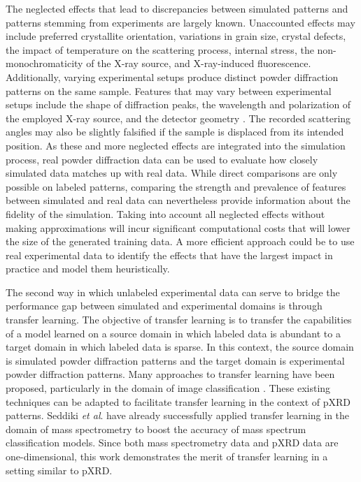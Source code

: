 The neglected effects that lead to discrepancies between simulated patterns and patterns stemming from experiments are largely known. Unaccounted effects may include preferred crystallite orientation, variations in grain size, crystal defects, the impact of temperature on the scattering process, internal stress, the non-monochromaticity of the X-ray source, and X-ray-induced fluorescence\cite{cao2024simxrd, Waseda2011, Pecharsky2023}. Additionally, varying experimental setups produce distinct powder diffraction patterns on the same sample. Features that may vary between experimental setups include the shape of diffraction peaks, the wavelength and polarization of the employed X-ray source, and the detector geometry \cite{cao2024simxrd, Waseda2011, Pecharsky2023}. The recorded scattering angles may also be slightly falsified if the sample is displaced from its intended position\cite{cao2024simxrd,hulbert2023}. As these and more neglected effects are integrated into the simulation process, real powder diffraction data can be used to evaluate how closely simulated data matches up with real data. While direct comparisons are only possible on labeled patterns, comparing the strength and prevalence of features between simulated and real data can nevertheless provide information about the fidelity of the simulation. Taking into account all neglected effects without making approximations will incur significant computational costs that will lower the size of the generated training data. A more efficient approach could be to use real experimental data to identify the effects that have the largest impact in practice and model them heuristically.

The second way in which unlabeled experimental data can serve to bridge the performance gap between simulated and experimental domains is through transfer learning. The objective of transfer learning is to transfer the capabilities of a model learned on a source domain in which labeled data is abundant to a target domain in which labeled data is sparse\cite{Zhuang2021}. In this context, the source domain is simulated powder diffraction patterns and the target domain is experimental powder diffraction patterns. Many approaches to transfer learning have been proposed, particularly in the domain of image classification \cite{Gatys2016, Ganin2015}.  These existing techniques can be adapted to facilitate transfer learning in the context of pXRD patterns. Seddiki \textit{et al}. have already successfully applied transfer learning in the domain of mass spectrometry to boost the accuracy of mass spectrum classification models\cite{Seddiki2020}. Since both mass spectrometry data and pXRD data are one-dimensional, this work demonstrates the merit of transfer learning in a setting similar to pXRD.

